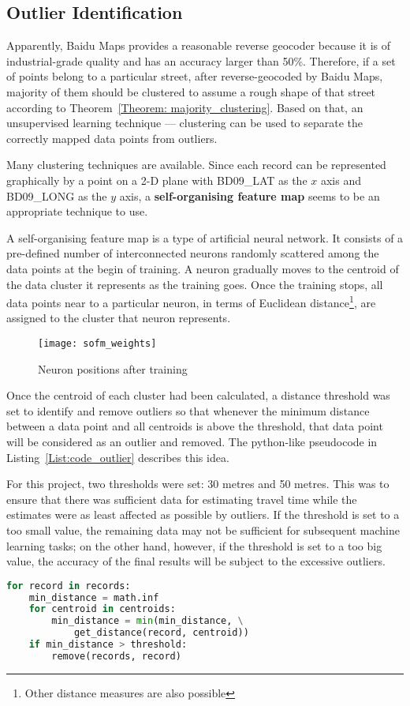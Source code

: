\subsection{Outlier Identification}
Apparently, Baidu Maps provides a reasonable reverse geocoder because it is of industrial-grade quality and has an accuracy larger than 50\%. Therefore, if a set of points belong to a particular street, after reverse-geocoded by Baidu Maps, majority of them should be clustered to assume a rough shape of that street according to Theorem~\ref{Theorem: majority_clustering}. Based on that, an unsupervised learning technique --- clustering can be used to separate the correctly mapped data points from outliers. 

Many clustering techniques are available\cite{LO05}. Since each record can be represented graphically by a point on a 2-D plane with BD09\_LAT as the $x$ axis and BD09\_LONG as the $y$ axis, a \textbf{self-organising feature map}\cite{TK82} seems to be an appropriate technique to use. 

A self-organising feature map is a type of artificial neural network. It consists of a pre-defined number of interconnected neurons randomly scattered among the data points at the begin of training. A neuron gradually moves to the centroid of the data cluster it represents as the training goes. Once the training stops, all data points near to a particular neuron, in terms of Euclidean distance\footnote{Other distance measures are also possible}, are assigned to the cluster that neuron represents. 

\begin{figure}[h]
\texttt{[image: sofm\_weights]}
\centering
\caption{Neuron positions after training}\label{Fig:sofm_position}
\end{figure}

Once the centroid of each cluster had been calculated, a distance threshold was set to identify and remove outliers so that whenever the minimum distance between a data point and all centroids is above the threshold, that data point will be considered as an outlier and removed. The python-like pseudocode in Listing~\ref{List:code_outlier} describes this idea. 

For this project, two thresholds were set: 30 metres and 50 metres. This was to ensure that there was sufficient data for estimating travel time while the estimates were as least affected as possible by outliers. If the threshold is set to a too small value, the remaining data may not be sufficient for subsequent machine learning tasks; on the other hand, however, if the threshold is set to a too big value, the accuracy of the final results will be subject to the excessive outliers. 

\begin{minipage}{\linewidth}
\begin{lstlisting}[language = Python, caption = {Pseudocode for outlier detection}, label = {List:code_outlier}]
for record in records:
	min_distance = math.inf
	for centroid in centroids:
		min_distance = min(min_distance, \
			get_distance(record, centroid))
	if min_distance > threshold:
		remove(records, record)
\end{lstlisting}
\end{minipage}
